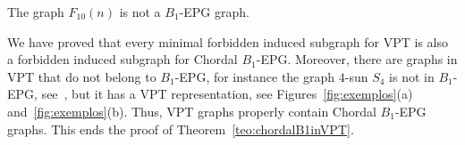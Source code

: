 

%


\begin{lema}\label{lem:f10}
The graph $F_{10}(n)$ is not a $B_1$-EPG graph. 
\end{lema}




We have proved that every minimal forbidden induced subgraph for VPT is also a  forbidden induced subgraph for Chordal $B_1$-EPG. Moreover, there are graphs in VPT that do not belong to $B_1$-EPG, for instance the graph $4$-sun $S_4$ is not in $B_1$-EPG, see~\cite{golumbic2009}, but it has a VPT representation, see Figures~\ref{fig:exemplos}(a) and~\ref{fig:exemplos}(b). Thus, VPT graphs  properly contain Chordal $B_1$-EPG graphs. This ends the proof of Theorem~\ref{teo:chordalB1inVPT}.  
  
